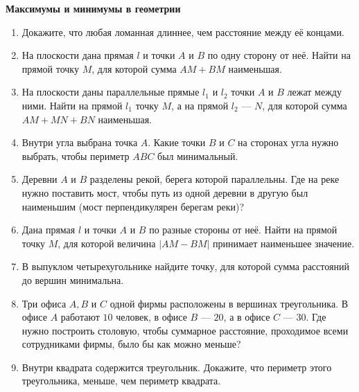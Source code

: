 \documentclass{article}
\begin{document}
\large

\begin{center}
\textbf{Максимумы и минимумы в геометрии}
\end{center}

\begin{enumerate}[label*=\protect\fbox{\arabic{enumi}}]

\item Докажите, что любая ломанная длиннее, чем расстояние между её концами.

\item На плоскости дана прямая $l$ и точки $A$ и $B$ по одну сторону от неё. Найти на прямой точку $M$, для которой сумма $AM +BM$ наименьшая.%

\item На плоскости даны параллельные прямые $l_1$ и $l_2$ точки $A$ и $B$ лежат между ними. Найти на прямой $l_1$ точку $M$, а на прямой $l_2$ --- $N$, для которой сумма $AM + MN + BN$ наименьшая.%

\item Внутри угла выбрана точка $A$. Какие точки $B$ и $C$ на сторонах угла нужно выбрать, чтобы периметр $ABC$ был минимальный. %

\item Деревни $A$ и $B$ разделены рекой, берега которой параллельны. Где на реке нужно поставить мост, чтобы путь из одной
деревни в другую был наименьшим (мост перпендикулярен берегам реки)? %

\item Дана прямая $l$ и точки  $A$ и $B$ по разные стороны от неё. Найти на прямой точку $M$, для которой величина $|AM-BM|$ принимает наименьшее значение.%

\item В выпуклом четырехугольнике найдите точку, для которой сумма расстояний до вершин минимальна. %

\item Три офиса $A, B$ и $C$ одной фирмы расположены в вершинах треугольника. В офисе $A$ работают $10$ человек, в офисе $B$ --- $20$, а в офисе $C$ --- $30$. Где нужно построить столовую, чтобы суммарное расстояние, проходимое всеми сотрудниками фирмы, было бы как можно меньше? %

\item Внутри квадрата содержится треугольник. Докажите, что периметр этого треугольника, меньше, чем периметр квадрата.


\end{enumerate}
\end{document}
